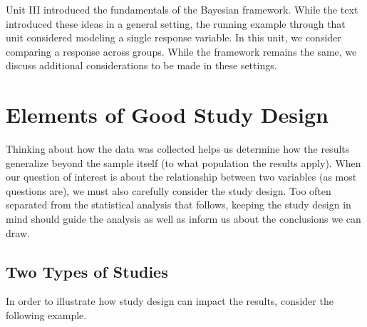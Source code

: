 \documentclass[
  letterpaper,
  DIV=11,
  numbers=noendperiod]{scrreprt}
\theoremstyle{definition}
\theoremstyle{definition}
\theoremstyle{plain}
\theoremstyle{remark}
\begin{document}
Unit III introduced the fundamentals of the Bayesian framework. While
the text introduced these ideas in a general setting, the running
example through that unit considered modeling a single response
variable. In this unit, we consider comparing a response across groups.
While the framework remains the same, we discuss additional
considerations to be made in these settings.

\hypertarget{sec-study-design}{%
\chapter{Elements of Good Study Design}\label{sec-study-design}}

\providecommand{\norm}[1]{\lVert#1\rVert}
\providecommand{\abs}[1]{\lvert#1\rvert}
\providecommand{\iid}{\stackrel{\text{IID}}{\sim}}
\providecommand{\ind}{\stackrel{\text{Ind}}{\sim}}

\providecommand{\bm}[1]{\mathbf{#1}}
\providecommand{\bs}[1]{\boldsymbol{#1}}
\providecommand{\bbeta}{\bs{\beta}}

\providecommand{\Ell}{\mathcal{L}}
\providecommand{\indep}{\perp\negthickspace\negmedspace\perp}

Thinking about how the data was collected helps us determine how the
results generalize beyond the sample itself (to what population the
results apply). When our question of interest is about the relationship
between two variables (as most questions are), we must also carefully
consider the study design. Too often separated from the statistical
analysis that follows, keeping the study design in mind should guide the
analysis as well as inform us about the conclusions we can draw.

\hypertarget{two-types-of-studies}{%
\section{Two Types of Studies}\label{two-types-of-studies}}

In order to illustrate how study design can impact the results, consider
the following example.
\end{document}
